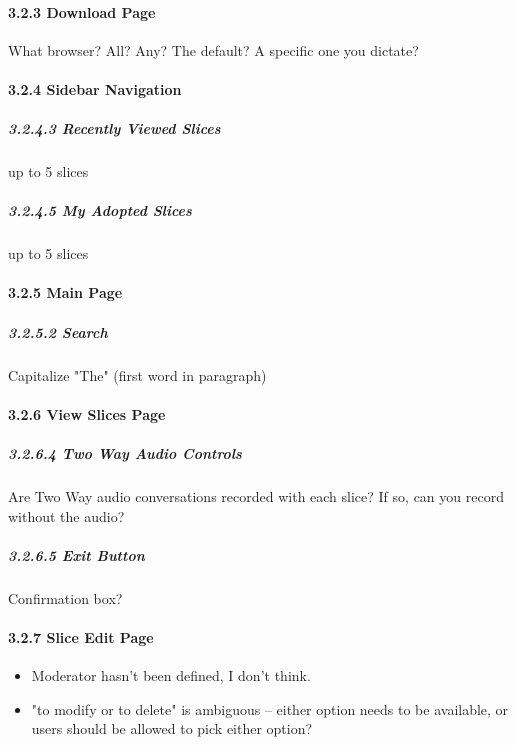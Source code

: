 \documentclass{article}
\begin{document}
\paragraph{3.2.3 Download Page} What browser?  All?  Any?  The default?  A
    specific one you dictate?


\paragraph{3.2.4 Sidebar Navigation}
\subparagraph{3.2.4.3  Recently Viewed Slices} up to 5 slices
\subparagraph{3.2.4.5  My Adopted Slices} up to 5 slices


\paragraph{3.2.5 Main Page}

\subparagraph{3.2.5.2 Search} Capitalize "The" (first word in paragraph)


\paragraph{3.2.6 View Slices Page}

\subparagraph{3.2.6.4 Two Way Audio Controls}
    Are Two Way audio conversations recorded with each slice?  If so, can you
    record without the audio?
\subparagraph{3.2.6.5 Exit Button}
    Confirmation box?


\paragraph{3.2.7 Slice Edit Page}

\begin{itemize}
    \item Moderator hasn't been defined, I don't think.  
    \item "to modify or to delete" is ambiguous -- either option needs to be
        available, or users should be allowed to pick either option?
\end{itemize}
\end{document}
